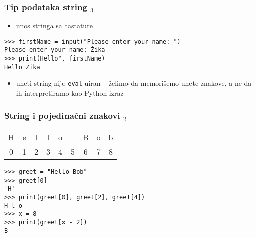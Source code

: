 \documentclass[utf8,compress,aspectratio=169]{beamer}
\begin{document}
\begin{frame}[fragile]
  \frametitle{Tip podataka string $_3$}
  \begin{itemize}
    \item unos stringa sa tastature
  \end{itemize}
\begin{verbatim}
>>> firstName = input("Please enter your name: ")
Please enter your name: Žika
>>> print(Hello", firstName)
Hello Žika
\end{verbatim}
  \begin{itemize}
    \item uneti string nije \texttt{eval}-uiran -- želimo da memorišemo unete znakove, a ne da ih interpretiramo kao Python izraz
  \end{itemize}
\end{frame}


\begin{frame}[fragile]
  \frametitle{String i pojedinačni znakovi $_2$}
\begin{tabular}{|c|c|c|c|c|c|c|c|c|}
\cline{1-9}
H & e & l & l & o & \  & B & o & b \\ \cline{1-9}
\multicolumn{1}{c}{0} & \multicolumn{1}{c}{1} & \multicolumn{1}{c}{2} & \multicolumn{1}{c}{3} & \multicolumn{1}{c}{4} & \multicolumn{1}{c}{5} & \multicolumn{1}{c}{6} & \multicolumn{1}{c}{7} & \multicolumn{1}{c}{8}
\end{tabular}
\begin{verbatim}
>>> greet = "Hello Bob"
>>> greet[0]
'H'
>>> print(greet[0], greet[2], greet[4])
H l o
>>> x = 8
>>> print(greet[x - 2])
B
\end{verbatim}
\end{frame}
\end{document}

